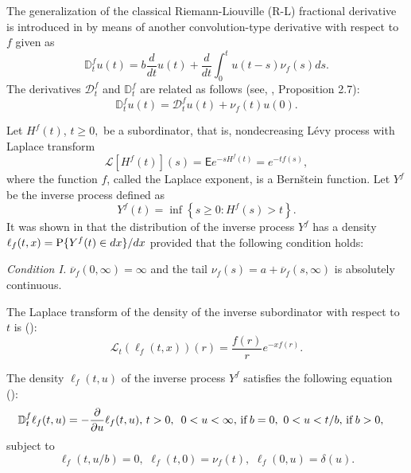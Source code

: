 \documentclass[12pt]{article}
\theoremstyle{definition}
\theoremstyle{plain}
\newcommand{\E}{\mathsf{E}}
\begin{document}
The generalization of the classical Riemann-Liouville (R-L) fractional derivative is introduced in \cite{T} by means of another convolution-type derivative with respect to $f$ given as
\begin{equation}\label{fDDt}
\mathbb{D}_t^f u(t)=b \frac{d}{dt}u(t)+\frac{d}{dt}\int_{0}^{t}u(t-s)\nu_f (s)ds.
\end{equation}
The derivatives $\mathcal{D}^f_t$ and $\mathbb{D}_t^f$ are related as follows (see, \cite{T}, Proposition 2.7):
\begin{equation}\label{fDtrelation}
\mathbb{D}_t^f u(t)=\mathcal{D}^f_t u(t) +\nu_f (t)u(0).
\end{equation}

Let $H^f(t)$, $t\geq0,$ be a subordinator, that is, nondecreasing L\'evy process with  Laplace transform 
$$\mathcal{L}[H^f(t)](s)=\E e^{-sH^f(t)}= e^{-t f(s)},$$
 where the function $f$, called the Laplace exponent, is a Bern\v{s}tein function. Let $Y^f$ be the inverse process defined as
\begin{equation}\label{Yf}
Y^f(t)=\inf \left\{s\geq0:H^f(s)>t\right\}.
\end{equation}
It was shown in \cite{T} that the distribution of the inverse process $Y^f$ has a density 
$\ell_f(t,x)={\rm P}\{Y^f(t)\in dx\}/dx$ 
provided that the following condition holds:

\medskip
{\it Condition I.} $\overline{\nu}_f(0,\infty)=\infty$ and the tail $\nu_f(s)=a+\overline{\nu}_f(s,\infty)$ is absolutely continuous.
\medskip

 The Laplace transform of the density of the inverse subordinator with respect to $t$ is (\cite{T}):
\begin{equation}\label{t-lapl-inv}
\mathcal{L}_t\left(\ell_f(t,x)\right)(r)=\frac{f(r)}{r}e^{-xf(r)}.
\end{equation}

The density $\ell_f(t,u)$ of the inverse process $Y^f$ satisfies the follo\-wing equation (\cite{T}):
\begin{align}\label{dlf}
	&{\mathbb{D}}_t^f \ell_f(t,u)=-\frac{\partial}{\partial  u} \ell_f(t,u), \, t>0,%
	\,\,\,0<u<\infty,\, {\rm if}\, b=0,\, %
	\, 0<u<t/b,\, {\rm if}\, b>0,%
\end{align}
subject to
\begin{equation}\label{dlfin}
\ell_f(t, {u}/{b})=0,\,\, \ell_f(t,0)=\nu_f(t),\,\, \ell_f(0,u)=\delta(u).
\end{equation}
\end{document}

